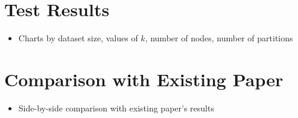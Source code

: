 \documentclass[11pt]{article}       %
\newenvironment{slide}[1]        {\section{#1} \begin{itemize}}%
                                 {\end{itemize}}
\begin{document}
\begin{slide}{Test Results}
\item Charts by dataset size, values of $k$, number of nodes, number of partitions
\end{slide}

\begin{slide}{Comparison with Existing Paper}
\item Side-by-side comparison with existing paper's results
\end{slide}




\end{document}
